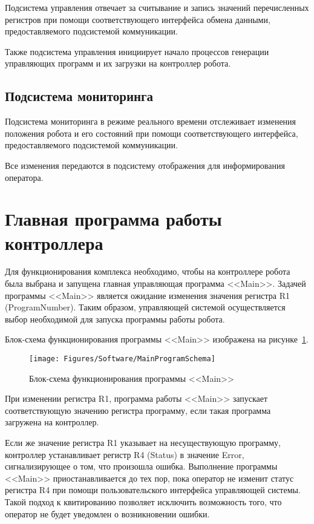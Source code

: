 Подсистема управления отвечает за считывание и запись значений перечисленных регистров при помощи соответствующего интерфейса обмена данными, предоставляемого подсистемой коммуникации.

Также подсистема управления инициирует начало процессов генерации управляющих программ и их загрузки на контроллер робота.

\subsection{Подсистема мониторинга}
Подсистема мониторинга в режиме реального времени отслеживает изменения положения робота и его состояний при помощи соответствующего интерфейса, предоставляемого подсистемой коммуникации.

Все изменения передаются в подсистему отображения для информирования оператора.


\section{Главная программа работы контроллера}
Для функционирования комплекса необходимо, чтобы на контроллере робота была выбрана и запущена главная управляющая программа <<Main>>.
Задачей программы <<Main>> является ожидание изменения значения регистра R1 (ProgramNumber).
Таким образом, управляющей системой осуществляется выбор необходимой для запуска программы работы робота.

Блок-схема функционирования программы <<Main>> изображена на рисунке~\ref{fig:MainProgramSchema}.

\begin{figure}[H]
    \centering
    \vspace{14pt}
    \texttt{[image: Figures/Software/MainProgramSchema]}
    \caption{Блок-схема функционирования программы <<Main>>}
    \label{fig:MainProgramSchema}
\end{figure}

При изменении регистра R1, программа работы <<Main>> запускает соответствующую значению регистра программу, если такая программа загружена на контроллер.

Если же значение регистра R1 указывает на несуществующую программу, контроллер устанавливает регистр R4 (Status) в значение Error, сигнализирующее о том, что произошла ошибка.
Выполнение программы <<Main>> приостанавливается до тех пор, пока оператор не изменит статус регистра R4 при помощи пользовательского интерфейса управляющей системы.
Такой подход к квитированию позволяет исключить возможность того, что оператор не будет уведомлен о возникновении ошибки.

